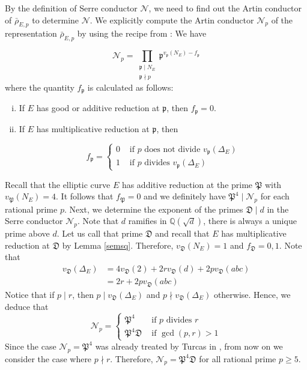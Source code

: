 \documentclass[]{article}
\newcommand {\QQ}{{\mathbb{Q}}}
\newcommand {\mfp}{{\mathfrak{P}}}
\newcounter{cases}
\begin{document}
By the definition of Serre conductor $\mathcal{N}$, we need to find out the Artin conductor of $\bar{\rho}_{E, p}$ to determine $\mathcal{N}$. We explicitly compute the Artin conductor $\mathcal{N}_p$ of the representation $\bar{\rho}_{E, p}$ by using the recipe from \cite{kraus1997determination}: We have 

$$\mathcal{N}_p=\prod_{\substack{\mathfrak{p} \mid N_E \\ \mathfrak{p} \nmid p}} \mathfrak{p}^{v_\mathfrak{p}(N_E)-f_\mathfrak{p}}$$where the quantity $f_\mathfrak{p}$ is calculated as follows:

\begin{enumerate}[(i)]
\item If $E$ has good or additive reduction at $\mathfrak{p}$, then $f_\mathfrak{p}=0$.
\item If $E$ has multiplicative reduction at $\mathfrak{p}$, then

$$
f_\mathfrak{p}= \begin{cases}0 & \text { if } p \text { does not divide } v_\mathfrak{p}(\Delta_E) \\ 1 & \text { if } p \text { divides } v_\mathfrak{p}(\Delta_E)\end{cases}
$$
\end{enumerate}

Recall that the elliptic curve $E$ has additive reduction at the prime $\mfp$ with $v_{\mfp}(N_E)=4$. It follows that $f_\mfp=0$ and we definitely have $\mfp^4\mid \mathcal{N}_p$ for each rational prime $p$. Next, we determine the exponent of the primes $\mathfrak{D}\mid d$ in the Serre conductor $\mathcal{N}_p$. Note that $d$ ramifies in $\QQ(\sqrt{d})$, there is always a unique prime above $d$. Let us call that prime $\mathfrak{D}$ and recall that $E$ has multiplicative reduction at $\mathfrak{D}$ by Lemma \ref{semsq}. Therefore, $v_{\mathfrak{D}}(N_E)=1$ and $f_\mathfrak{D}=0,1$. Note that \begin{align*}
      v_{\mathfrak{D}}(\Delta_E)&=4v_{\mathfrak{D}}(2)+2rv_{\mathfrak{D}}(d)+2pv_{\mathfrak{D}}(abc)\\
      &=2r+2pv_{\mathfrak{D}}(abc)
    \end{align*}Notice that if $p\mid r$, then $p\mid v_{\mathfrak{D}}(\Delta_E)$ and  $p\nmid v_{\mathfrak{D}}(\Delta_E)$ otherwise. Hence, we deduce that $$
\mathcal{N}_p= \begin{cases}\mfp^4 & \text { if } p \text {  divides } r \\ \mfp^4\mathfrak{D} & \text { if } \gcd(p,r)>1 \end{cases}
$$Since the case $\mathcal{N}_p=\mfp^4$ was already treated by Turcas in \cite{cturcacs2020serre}, from now on we consider the case where $p\nmid r$. Therefore, $\mathcal{N}_p=\mfp^4\mathfrak{D}$ for all rational prime $p\ge 5$.
\end{document}
